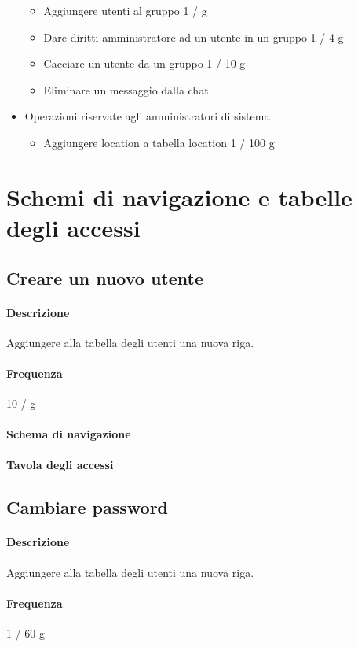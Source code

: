 \documentclass[a4paper,12pt]{report}
\begin{document}
\begin{itemize}
{\begin{itemize}
        \item Aggiungere utenti al gruppo 1 / g
        \item Dare diritti amministratore ad un utente in un gruppo 1 / 4 g
        \item Cacciare un utente da un gruppo 1 / 10 g
        \item Eliminare un messaggio dalla chat
      \end{itemize}
    }
  \item {
      Operazioni riservate agli amministratori di sistema
      \begin{itemize}
        \item Aggiungere location a tabella location 1 / 100 g
      \end{itemize} 
    }
 
\end{itemize}
\section{Schemi di navigazione e tabelle degli accessi}
\subsection{Creare un nuovo utente}
\paragraph{Descrizione} Aggiungere alla tabella degli utenti una nuova riga. 
\paragraph{Frequenza} 10 / g 
\paragraph{Schema di navigazione} 
\paragraph{Tavola degli accessi}
\subsection{Cambiare password}
\paragraph{Descrizione} Aggiungere alla tabella degli utenti una nuova riga. 
\paragraph{Frequenza} 1 / 60 g 
\end{document}
